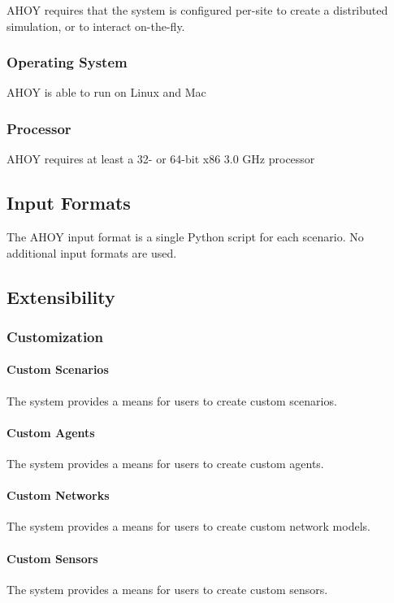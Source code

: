 \documentclass[titlepage]{article}
\newcommand{\cbox}[0]{
    \CheckBox[height=5pt,width=5pt]{}
}
\begin{document}
\begin{Form}
AHOY requires that the system is configured per-site to create a distributed simulation, or to interact on-the-fly.\cbox


\subsubsection{Operating System%
  \label{operating-system}%
}

AHOY is able to run on Linux and Mac\cbox


\subsubsection{Processor%
  \label{processor}%
}

AHOY requires at least a 32- or 64-bit x86 3.0 GHz processor\cbox


\subsection{Input Formats%
  \label{input-formats}%
}

The AHOY input format is a single Python script for each scenario.  No additional input formats are used.\cbox


\subsection{Extensibility%
  \label{extensibility}%
}
\subsubsection{Customization}
    \paragraph{Custom Scenarios} The system provides a means for users to create custom scenarios.\cbox
    \paragraph{Custom Agents} The system provides a means for users to create custom agents.\cbox
    \paragraph{Custom Networks} The system provides a means for users to create custom network models.\cbox
    \paragraph{Custom Sensors} The system provides a means for users to create custom sensors.\cbox



\end{Form}
\end{document}
